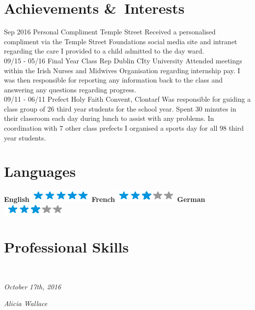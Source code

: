 \documentclass[]{friggeri-cv}
\begin{document}
\section{Achievements \&\ Interests}
\begin{entrylist}
  \entry
    {Sep 2016}
    {Personal Compliment}
    {Temple Street}
    {Received a personalised compliment via the Temple Street Foundations social media site and intranet regarding the care I provided to a child admitted to the day ward.\\}
  \entry
    {09/15 - 05/16}
    {Final Year Class Rep}
    {Dublin CIty University}
    {Attended meetings within the Irish Nurses and Midwives Organisation regarding
internship pay. I was then responsible for reporting any information back to the class
and answering any questions regarding progress.
\\}
  \entry
    {09/11 - 06/11}
    {Prefect}
    {Holy Faith Convent, Clontarf}
    {Was responsible for guiding a class group of 26 third year students for the school year.
Spent 30 minutes in their classroom each day during lunch to assist with any problems.
In coordination with 7 other class prefects I organised a sports day for all 98 third
year students.\\}
\end{entrylist}





\begin{aside}

  \section{Languages}
    \textbf{English}\includegraphics[scale=0.40]{img/5stars.png}
    \textbf{French}\includegraphics[scale=0.40]{img/3stars.png}
    \textbf{German}\includegraphics[scale=0.40]{img/3stars.png}
    ~
 
 \section{Professional Skills}
    ~
\end{aside}


\begin{flushleft}
\emph{October 17th, 2016}
\end{flushleft}
\begin{flushright}
\emph{Alicia Wallace}
\end{flushright}
\end{document}
